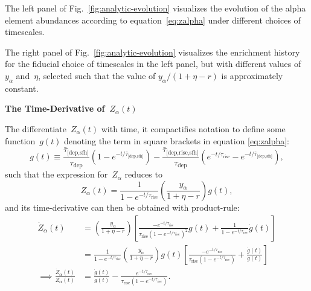\documentclass[12pt]{article}
\newcommand{\timescale}[1]{\ensuremath{\tau_\text{#1}}}
\newcommand{\harmonic}[2]{\ensuremath{\bar{\tau}_\text{[#1,#2]}}}
\newcommand{\hharmonic}[3]{\ensuremath{\bar{\tau}_\text{[#1,#2,#3]}}}
\begin{document}
The left panel of Fig.~\ref{fig:analytic-evolution} visualizes the evolution of
the alpha element abundances according to equation~\ref{eq:zalpha} under
different choices of timescales.
\par
The right panel of Fig.~\ref{fig:analytic-evolution} visualizes the enrichment
history for the fiducial choice of timescales in the left panel, but with
different values of~$y_\alpha$ and~$\eta$, selected such that the value of
$y_\alpha / (1 + \eta - r)$ is approximately constant.
\par\null\par\noindent
\textbf{The Time-Derivative of~$Z_\alpha(t)$}
\par\noindent
The differentiate~$Z_\alpha(t)$ with time, it compactifies notation to define
some function~$g(t)$ denoting the term in square brackets in equation
\ref{eq:zalpha}:
\begin{equation}
g(t) \equiv \frac{\harmonic{dep}{sfh}}{\timescale{dep}}
\left(1 - e^{-t / \harmonic{dep}{sfh}}\right) -
\frac{\hharmonic{dep}{rise}{sfh}}{\timescale{dep}}
\left(e^{-t / \timescale{rise}} - e^{-t / \harmonic{dep}{sfh}}\right),
\label{eq:g}
\end{equation}
such that the expression for~$Z_\alpha$ reduces to
\begin{equation}
Z_\alpha(t) = \frac{1}{1 - e^{-t / \timescale{rise}}}
\left(\frac{y_\alpha}{1 + \eta - r}\right) g(t),
\end{equation}
and its time-derivative can then be obtained with product-rule:
\begin{subequations}\begin{align}
\dot{Z}_\alpha(t) &= \left(\frac{y_\alpha}{1 + \eta - r}\right)\left[
\frac{
	-e^{-t / \timescale{rise}}
}{
	\timescale{rise} \left(1 - e^{-t / \timescale{rise}}\right)^2
} g(t) + \frac{1}{1 - e^{-t / \timescale{rise}}} \dot{g}(t)
\right]
\\
&= \frac{1}{1 - e^{-t / \timescale{rise}}}
\left(\frac{y_\alpha}{1 + \eta - r}\right) g(t)
\left[
\frac{
	-e^{-t / \timescale{rise}}
}{
	\timescale{rise} \left(1 - e^{-t / \timescale{rise}}\right)
} + \frac{\dot{g}(t)}{g(t)}\right]
\label{eq:zdotalpha}
\\
\implies \frac{\dot{Z}_\alpha(t)}{Z_\alpha(t)} &=
\frac{\dot{g}(t)}{g(t)} - \frac{
	e^{-t / \timescale{rise}}
}{
	\timescale{rise} \left(1 - e^{-t / \timescale{rise}}\right)
}.
\label{eq:zdotalpha_over_zalpha}
\end{align}\end{subequations}
\end{document}
